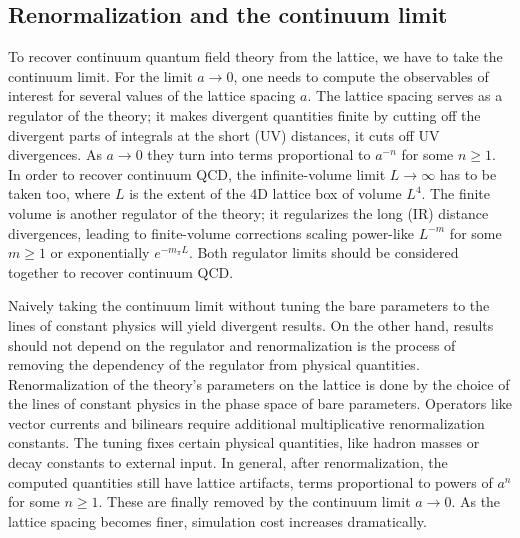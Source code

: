 

\subsection{Renormalization and the continuum limit}


To recover continuum quantum field theory from the lattice, we have to take the continuum limit.
For the limit $a \to 0$, one needs to compute the observables of interest for several values of the lattice spacing $a$.
The lattice spacing serves as a regulator of the theory; it makes divergent quantities finite by cutting off the divergent parts of integrals at the short (UV) distances, \ie it cuts off UV divergences.
As $a \to 0$ they turn into terms proportional to $a^{-n}$ for some $n \geq 1$.
In order to recover continuum QCD, the infinite-volume limit $L \to \infty$ has to be taken too, where $L$ is the extent of the 4D lattice box of volume $L^{4}$.
The finite volume is another regulator of the theory; it regularizes the long (IR) distance divergences, leading to finite-volume corrections scaling power-like $L^{-m}$ for some $m \geq 1$ or exponentially $e^{-m_{\pi} L}$.
Both regulator limits should be considered together to recover continuum QCD.

Naively taking the continuum limit without tuning the bare parameters to the lines of constant physics will yield divergent results.
On the other hand, results should not depend on the regulator and renormalization is the process of removing the dependency of the regulator from physical quantities.
Renormalization of the theory's parameters on the lattice is done by the choice of the lines of constant physics in the phase space of bare parameters.
Operators like vector currents and bilinears require additional multiplicative renormalization constants.
The tuning fixes certain physical quantities, like hadron masses or decay constants to external input.
In general, after renormalization, the computed quantities still have lattice artifacts, \ie terms proportional to powers of $a^{n}$ for some $n \geq 1$.
These are finally removed by the continuum limit $a \to 0$.
As the lattice spacing becomes finer, simulation cost increases dramatically.

